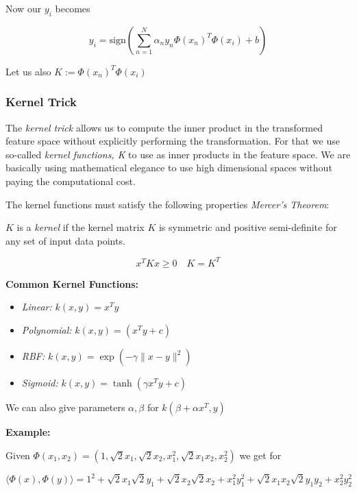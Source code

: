 Now our \(y_i\) becomes 

\[
    y_i = \text{sign} \left(\sum_{n = 1}^{N} \alpha_n y_n \Phi(x_n)^T \Phi(x_i) + b \right)
\]

Let us also \(K:= \Phi(x_n)^T \Phi(x_i)\)

\subsubsection{Kernel Trick}

The \emph{kernel trick} allows us to compute the inner product in the transformed feature space without explicitly performing the transformation.
For that we use so-called \emph{kernel functions, K} to use as inner products in the feature space. We are basically using 
mathematical elegance to use high dimensional spaces without paying the computational cost.

The kernel functions must satisfy the following properties \emph{Mercer's Theorem}:

\(K\) is a \emph{kernel} if the kernel matrix \(K\) is symmetric and positive semi-definite for any set of input data points. 

\[
    x^T K x \ge 0 \quad K = K^T
\]

\textbf{Common Kernel Functions:}

\begin{itemize}

    \item \emph{Linear:} \(k(x,y) = x^T y\)
    
    \item \emph{Polynomial:} \(k(x,y) = (x^T y + c)\)

    \item \emph{RBF:} \(k(x,y) = \exp( -\gamma \|x -  y \|^2)\)
    
    \item \emph{Sigmoid:} \(k(x,y) = \tanh( \gamma x^Ty + c)\)

\end{itemize}

We can also give parameters \(\alpha, \beta\) for \(k(\beta + \alpha x^T, y)\)

\textbf{Example:}

Given \(\Phi(x_1, x_2) = (1, \sqrt{2}x_1, \sqrt{2}x_2, x_1^2, \sqrt{2}x_1x_2, x_2^2)\) we 
get for 

\[
    \langle \Phi(x), \Phi(y)\rangle = 1^2 +  \sqrt{2}x_1\sqrt{2}y_1 + \sqrt{2}x_2\sqrt{2}x_2 + x_1^2 y_1^2 + \sqrt{2}x_1x_2 \sqrt{2}y_1y_2 + x_2^2 y_2^2
\]

